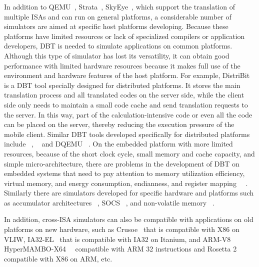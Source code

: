 In addition to QEMU~\cite{DBLP:conf/usenix/Bellard05}, Strata~\cite{DBLP:conf/cgo/ScottKVCDS03}, SkyEye~\cite{DBLP:conf/icppw/YuJHC06}, which support the translation of multiple ISAs and can run on general platforms, a considerable number of simulators are aimed at specific host platforms developing.
Because these platforms have limited resources or lack of specialized compilers or application developers, DBT is needed to simulate applications on common platforms. Although this type of simulator has lost its versatility, it can obtain good performance with limited hardware resources because it makes full use of the environment and hardware features of the host platform.
For example, DistriBit ~\cite{DBLP:conf/hpdc/GuanYCGLC10} is a DBT tool specially designed for distributed platforms.
It stores the main translation process and all translated codes on the server side, while the client side only needs to maintain a small code cache and send translation requests to the server.
In this way, part of the calculation-intensive code or even all the code can be placed on the server, thereby reducing the execution pressure of the mobile client.
Similar DBT tools developed specifically for distributed platforms include ~\cite{DBLP:journals/jsa/HsuHHLW15}, ~\cite{DBLP:conf/mobisys/WangYZMWB17} and DQEMU ~\cite{DBLP:conf/icpp/ZhaoJLGWY20}.
On the embedded platform with more limited resources, because of the short clock cycle, small memory and cache capacity, and simple micro-architecture, there are problems in the development of DBT on embedded systems that need to pay attention to memory utilization efficiency, virtual memory, and energy consumption, endianness, and register mapping ~\cite{DBLP:conf/vee/KondohK10}~\cite{DBLP:conf/icit2/SalgadoGCMT19}.
Similarly there are simulators developed for specific hardware and platforms such as accumulator architectures ~\cite{DBLP:conf/cgo/KimS03}, SOCS ~\cite{DBLP:journals/corr/abs-0710-4644}, and non-volatile memory ~\cite{DBLP:journals/jss/WuDFZWZ22}.

In addition, cross-ISA simulators can also be compatible with applications on old platforms on new hardware, such as Crusoe~\cite{dehnert2003transmeta} that is compatible with X86 on VLIW, IA32-EL~\cite{DBLP:conf/micro/BarazDEGSWZ03} that is compatible with IA32 on Itanium, and ARM-V8 HyperMAMBO-X64~\cite{DBLP:conf/vee/DAntrasGGGL17}~\cite{DBLP:conf/pldi/DAntrasGGL17} compatible with ARM 32 instructions and Rosetta 2 compatible with X86 on ARM, etc.

